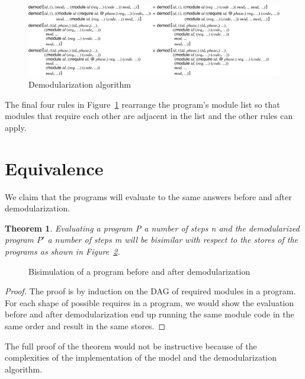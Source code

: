 \begin{figure}[!h]
\includegraphics[width=\textwidth]{figures/demod-redex3}
\caption{Demodularization algorithm}
\label{fig:demod-redex3}
\end{figure}

The final four rules in Figure~\ref{fig:demod-redex3} rearrange the program's module list so that modules that require each other are adjacent in the list and the other rules can apply.

\section{Equivalence}
We claim that the programs will evaluate to the same answers before and after demodularization. 

\newtheorem*{theorem}{Theorem}
\begin{theorem}
Evaluating a program P a number of steps n and the demodularized program $P'$ a number of steps m will be bisimilar with respect to the stores of the programs as shown in Figure~\ref{fig:bisim.tex}.
\end{theorem}

\begin{figure}[h]
  \centering
  
  \caption{Bisimulation of a program before and after demodularization}
  \label{fig:bisim.tex}
\end{figure}


\begin{proof}
The proof is by induction on the DAG of required modules in a program.
For each shape of possible requires in a program, we would show the evaluation before and after demodularization end up running the same module code in the same order and result in the same stores.
\end{proof}

The full proof of the theorem would not be instructive because of the complexities of the implementation of the model and the demodularization algorithm.


